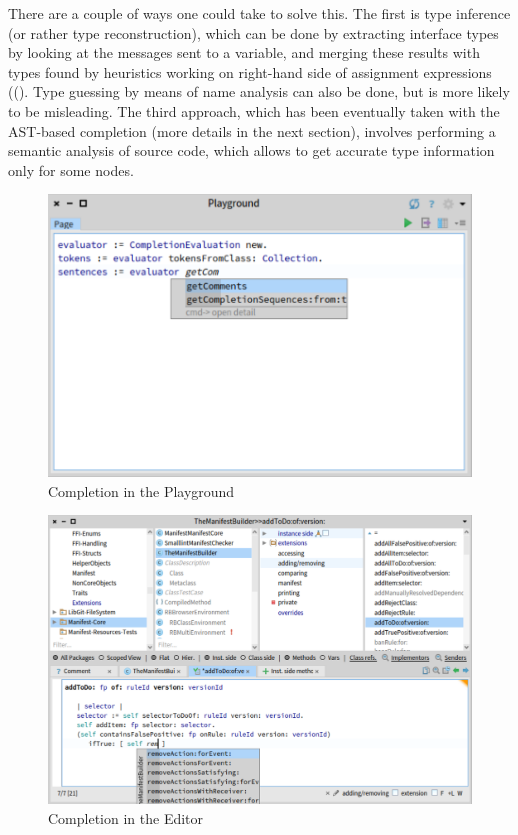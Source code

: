 There are a couple of ways one could take to solve this. The first is type inference (or rather type reconstruction), which can be done by extracting interface types by looking at the messages sent to a variable, and merging these results with types found by heuristics working on right-hand side of assignment expressions ((\cite{Pluq09a}). Type guessing by means of name analysis can also be done, but is more likely to be misleading. The third approach, which has been eventually taken with the AST-based completion (more details in the next section), involves performing a semantic analysis of source code, which allows to get accurate type information only for some nodes.

\begin{figure}[H]
    \centering
    \includegraphics[width=0.9\linewidth]{images/completion1.png}
    \caption{Completion in the Playground}
    \label{fig:playground}
\end{figure}

\begin{figure}[H]
    \centering
    \includegraphics[width=0.9\linewidth]{images/completion2.png}
    \caption{Completion in the Editor}
    \label{fig:editor}
\end{figure}

